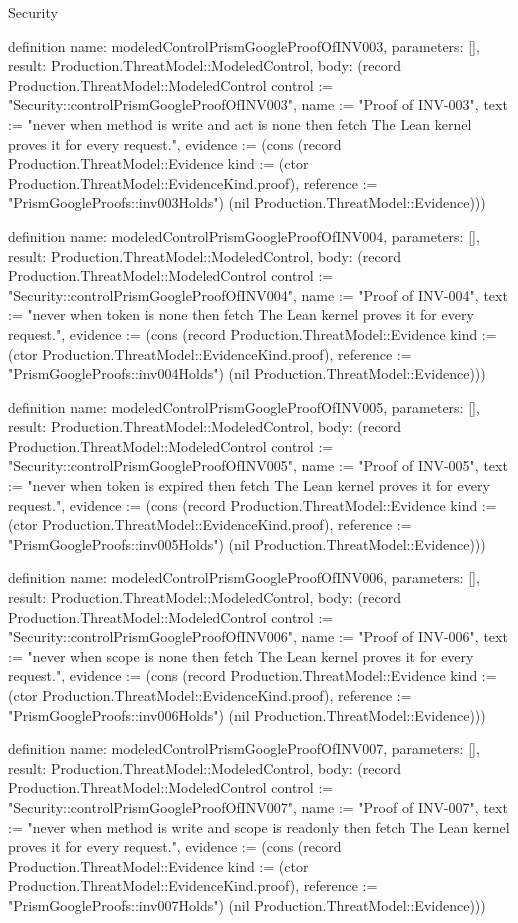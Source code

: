 \begin{lexlean}{Security}
\begin{semanticmodule}
definition{
  name: modeledControlPrismGoogleProofOfINV003,
  parameters: [],
  result: Production.ThreatModel::ModeledControl,
  body: (record Production.ThreatModel::ModeledControl {control := "Security::controlPrismGoogleProofOfINV003", name := "Proof of INV-003", text := "never when method is write and act is none then fetch The Lean kernel proves it for every request.", evidence := (cons (record Production.ThreatModel::Evidence {kind := (ctor Production.ThreatModel::EvidenceKind.proof), reference := "PrismGoogleProofs::inv003Holds"}) (nil Production.ThreatModel::Evidence))})
}

definition{
  name: modeledControlPrismGoogleProofOfINV004,
  parameters: [],
  result: Production.ThreatModel::ModeledControl,
  body: (record Production.ThreatModel::ModeledControl {control := "Security::controlPrismGoogleProofOfINV004", name := "Proof of INV-004", text := "never when token is none then fetch The Lean kernel proves it for every request.", evidence := (cons (record Production.ThreatModel::Evidence {kind := (ctor Production.ThreatModel::EvidenceKind.proof), reference := "PrismGoogleProofs::inv004Holds"}) (nil Production.ThreatModel::Evidence))})
}

definition{
  name: modeledControlPrismGoogleProofOfINV005,
  parameters: [],
  result: Production.ThreatModel::ModeledControl,
  body: (record Production.ThreatModel::ModeledControl {control := "Security::controlPrismGoogleProofOfINV005", name := "Proof of INV-005", text := "never when token is expired then fetch The Lean kernel proves it for every request.", evidence := (cons (record Production.ThreatModel::Evidence {kind := (ctor Production.ThreatModel::EvidenceKind.proof), reference := "PrismGoogleProofs::inv005Holds"}) (nil Production.ThreatModel::Evidence))})
}

definition{
  name: modeledControlPrismGoogleProofOfINV006,
  parameters: [],
  result: Production.ThreatModel::ModeledControl,
  body: (record Production.ThreatModel::ModeledControl {control := "Security::controlPrismGoogleProofOfINV006", name := "Proof of INV-006", text := "never when scope is none then fetch The Lean kernel proves it for every request.", evidence := (cons (record Production.ThreatModel::Evidence {kind := (ctor Production.ThreatModel::EvidenceKind.proof), reference := "PrismGoogleProofs::inv006Holds"}) (nil Production.ThreatModel::Evidence))})
}

definition{
  name: modeledControlPrismGoogleProofOfINV007,
  parameters: [],
  result: Production.ThreatModel::ModeledControl,
  body: (record Production.ThreatModel::ModeledControl {control := "Security::controlPrismGoogleProofOfINV007", name := "Proof of INV-007", text := "never when method is write and scope is readonly then fetch The Lean kernel proves it for every request.", evidence := (cons (record Production.ThreatModel::Evidence {kind := (ctor Production.ThreatModel::EvidenceKind.proof), reference := "PrismGoogleProofs::inv007Holds"}) (nil Production.ThreatModel::Evidence))})
}


\end{semanticmodule}
\end{lexlean}
